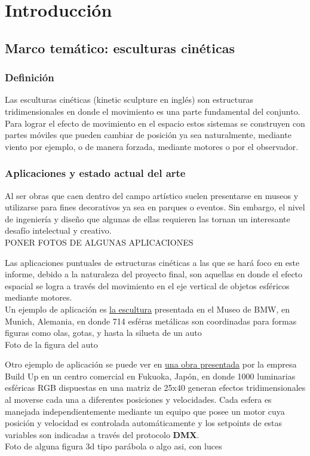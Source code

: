 \chapter{Introducción}
\thispagestyle{empty}


\section{Marco temático: esculturas cinéticas}
\subsection{Definición}
Las esculturas cinéticas (kinetic sculpture en inglés) son estructuras tridimensionales en donde el movimiento es una parte fundamental del conjunto. Para lograr el efecto de movimiento en el espacio estos sistemas se construyen con partes móviles que pueden cambiar de posición ya sea naturalmente, mediante viento por ejemplo, o de manera forzada, mediante motores o por el observador.\\
\subsection{Aplicaciones y estado actual del arte}
Al ser obras que caen dentro del campo artístico suelen presentarse en museos y utilizarse para fines decorativos ya sea en parques o eventos. Sin embargo, el nivel de ingeniería y diseño que algunas de ellas requieren las tornan un interesante desafío intelectual y creativo.\\[0.5cm]

\textcolor{FIXME}{PONER FOTOS DE ALGUNAS APLICACIONES}


Las aplicaciones puntuales de estructuras cinéticas a las que se hará foco en este informe, debido a la naturaleza del proyecto final, son aquellas en donde el efecto espacial se logra a través del movimiento en el eje vertical de objetos esféricos mediante motores. \\


Un ejemplo de aplicación es \href{https://www.youtube.com/watch?v=HVhVClFMg6Y}{la escultura} presentada en el Museo de BMW, en Munich, Alemania, en donde 714 esféras metálicas son coordinadas para formas figuras como olas, gotas, y hasta la silueta de un auto \\
\textcolor{FIXME}{Foto de la figura del auto}

Otro ejemplo de aplicación se puede ver en \href{https://www.youtube.com/watch?v=ICixCazf6-k}{una obra presentada} por la empresa Build Up en un centro comercial en Fukuoka, Japón, en donde 1000 luminarias esféricas RGB dispuestas en una matriz de 25x40 generan efectos tridimensionales al moverse cada una a diferentes posiciones y velocidades. Cada esfera es manejada independientemente mediante un equipo que posee un motor cuya posición y velocidad es controlada automáticamente y los setpoints de estas variables son indicadas a través del protocolo \textbf{DMX}.\\
\textcolor{FIXME}{Foto de alguna figura 3d tipo parábola o algo asi, con luces}


